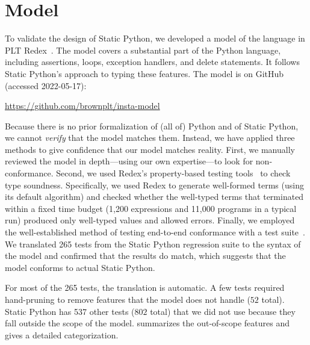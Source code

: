 \documentclass[english,cleveref,crc]{programming}
\newcommand{\SP}{Static Python}
\newcommand{\totalnum}[1]{$#1$ total}
\newcommand{\numSPtest}{265}
\newcommand{\numSPtotal}{802} %
\newcommand{\numSPdiff}{537} %
\begin{document}
\section{Model}
\label{s:model}

To validate the design of \SP{}, we developed a model of the language in PLT
Redex~\cite{kcdeffmrtf-popl-2012}.
The model covers a substantial part of the Python language, including
assertions, loops, exception handlers, and delete statements.
It follows \SP{}'s approach to typing these features.
The model is on GitHub (accessed 2022-05-17):
\begin{center}
  \url{https://github.com/brownplt/insta-model}
\end{center}
Because there is no prior formalization of (all of) Python and of \SP{}, we cannot
\emph{verify} that the model matches them. Instead, we have applied
three methods to give confidence that our model matches reality.
First, we manually reviewed the model in depth---using our
own expertise---to look for non-conformance.  Second, 
we used Redex's property-based testing tools~\cite{kf-sfp-2009} to check
type soundness.
Specifically, we used Redex to generate well-formed terms (using its default
algorithm) and checked whether the well-typed terms that terminated within a
fixed time budget (1,200 expressions and 11,000 programs in a typical run)
produced only well-typed values and allowed errors.
Finally, we employed the well-established method of testing end-to-end
conformance with a test suite~\cite{gsk-ecoop-2010,gclpk-dls-2012,pmmwplck-oopsla-2013,bcfgmnss-popl-2014,fgpssmds-popl-2016}.
We translated \numSPtest{} tests from the \SP{} regression suite to the
syntax of the model and confirmed that the results
do match,
which suggests that the model conforms to actual \SP{}.

For most of the \numSPtest{} tests, the translation is automatic.
A few tests required hand-pruning to remove features that the model does not
handle (\totalnum{52}).
\SP{} has \numSPdiff{} other tests (\totalnum{\numSPtotal{}}) that we did not
use because they fall outside the scope of the model.
 summarizes the out-of-scope features and  gives
a detailed categorization.

\end{document}
